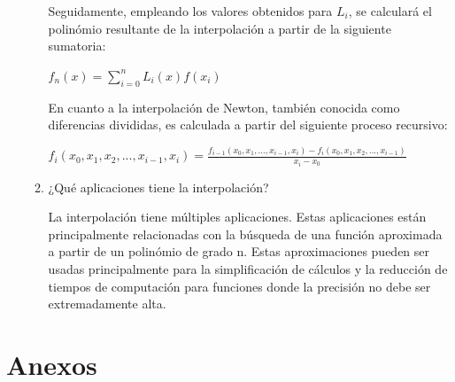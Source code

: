 \documentclass[english,notitlepage,letterpaper, 10pt]{article} %
\begin{document}
\begin{enumerate}
\begin{enumerate}
      Seguidamente, empleando los valores obtenidos para $L_i$, se calculará el polinómio resultante de la interpolación a partir de la siguiente sumatoria:

      \begin{center}
        \begin{math}
          f_n(x)  = \displaystyle\sum_{i=0}^n L_i(x)f(x_i)
        \end{math}
      \end{center}
      
      En cuanto a la interpolación de Newton, también conocida como diferencias divididas, es calculada a partir del siguiente proceso recursivo:

      \begin{center}
        \begin{math}
          \displaystyle f_i(x_0,x_1,x_2,...,x_{i-1},x_i) = \frac{ f_{i-1}(x_0,x_1,...,x_{i-1},x_i)-f_i(x_0,x_1,x_2,...,x_{i-1})}{x_i - x_0}
        \end{math}
      \end{center}

      \item ¿Qué aplicaciones tiene la interpolación?

      La interpolación tiene múltiples aplicaciones. Estas aplicaciones están principalmente relacionadas con la búsqueda de una función aproximada a partir de un polinómio de grado n. Estas aproximaciones pueden ser usadas principalmente para la simplificación de cálculos y la reducción de tiempos de computación para funciones donde la precisión no debe ser extremadamente alta.

    \end{enumerate}

\end{enumerate}


\newpage

\section{Anexos}
\end{document}

